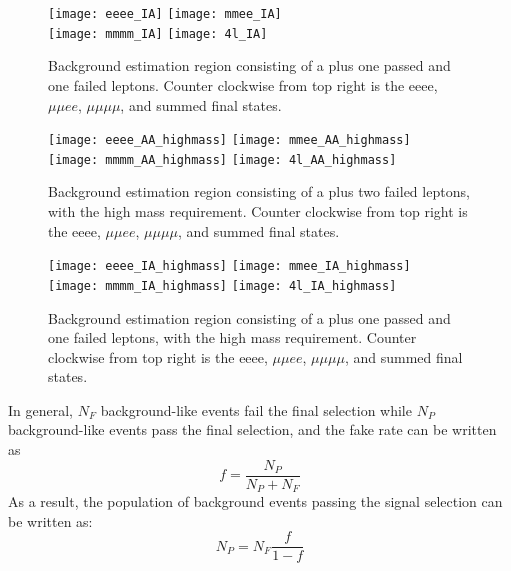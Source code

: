 \begin{figure}[h]
\centering
\texttt{[image: eeee\_IA]}
\texttt{[image: mmee\_IA]}\\
\texttt{[image: mmmm\_IA]}
\texttt{[image: 4l\_IA]}\\
\caption[Background estimation region consisting of a \Z plus one passed and one failed
leptons.]{Background estimation region consisting of a \Z plus one passed and
    one failed leptons. Counter clockwise from top right is the eeee, $\mu\mu
    ee$, $\mu\mu\mu\mu$, and summed final states.}
\label{fig:AIregions}
\end{figure}

\begin{figure}[h]
\centering
\texttt{[image: eeee\_AA\_highmass]}
\texttt{[image: mmee\_AA\_highmass]}\\
\texttt{[image: mmmm\_AA\_highmass]}
\texttt{[image: 4l\_AA\_highmass]}\\
\caption[Background estimation region consisting of a \Z plus two failed
leptons, with the high mass requirement.]{Background estimation region consisting of a \Z plus two failed
leptons, with the high mass requirement. Counter clockwise from top right is the eeee, $\mu\mu ee$,
$\mu\mu\mu\mu$, and summed final states.}
\label{fig:AAregions_highmass}
\end{figure}

\begin{figure}[h]
\centering
\texttt{[image: eeee\_IA\_highmass]}
\texttt{[image: mmee\_IA\_highmass]}\\
\texttt{[image: mmmm\_IA\_highmass]}
\texttt{[image: 4l\_IA\_highmass]}\\
\caption[Background estimation region consisting of a \Z plus one passed and one failed
leptons, with the high mass requirement.]{Background estimation region consisting of a \Z plus one passed and
    one failed leptons, with the high mass requirement. Counter clockwise from top right is the eeee, $\mu\mu
    ee$, $\mu\mu\mu\mu$, and summed final states.}
\label{fig:AIregions_highmass}
\end{figure}


In general, $N_F$ background-like events fail the final selection while $N_P$
background-like events pass the final selection, and the fake rate can be written as
\begin{equation}
    f = \frac{N_P}{N_P+N_F} 
\end{equation}
As a result, the population of background events passing the signal selection
can be written as:
\begin{equation}
    \label{eqn:np}
    N_P = N_F \frac{f}{1-f}
\end{equation}

